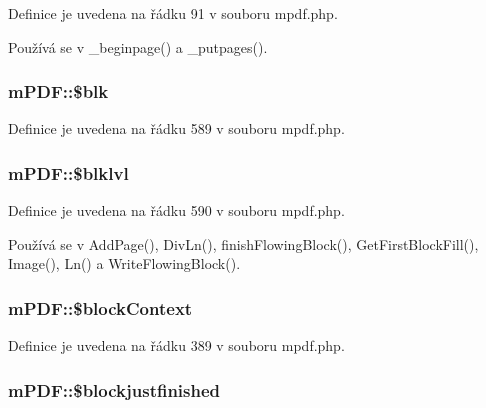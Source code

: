 Definice je uvedena na řádku 91 v souboru mpdf.\-php.



Používá se v \-\_\-beginpage() a \-\_\-putpages().

\hypertarget{classm_p_d_f_a02ce9503043f4b5527c0c0331f15a8ce}{
\subsubsection[{\$blk}]{\setlength{\rightskip}{0pt plus 5cm}m\-P\-D\-F\-::\$blk}}\label{classm_p_d_f_a02ce9503043f4b5527c0c0331f15a8ce}


Definice je uvedena na řádku 589 v souboru mpdf.\-php.

\hypertarget{classm_p_d_f_a26838ab1574182eb942f1f785b0ff3e9}{
\subsubsection[{\$blklvl}]{\setlength{\rightskip}{0pt plus 5cm}m\-P\-D\-F\-::\$blklvl}}\label{classm_p_d_f_a26838ab1574182eb942f1f785b0ff3e9}


Definice je uvedena na řádku 590 v souboru mpdf.\-php.



Používá se v Add\-Page(), Div\-Ln(), finish\-Flowing\-Block(), Get\-First\-Block\-Fill(), Image(), Ln() a Write\-Flowing\-Block().

\hypertarget{classm_p_d_f_aeb8bf2e8132366c2524ad737f728346c}{
\subsubsection[{\$block\-Context}]{\setlength{\rightskip}{0pt plus 5cm}m\-P\-D\-F\-::\$block\-Context}}\label{classm_p_d_f_aeb8bf2e8132366c2524ad737f728346c}


Definice je uvedena na řádku 389 v souboru mpdf.\-php.

\hypertarget{classm_p_d_f_a0d538b74c8bb54c8ad1194fbfa8b88a8}{
\subsubsection[{\$blockjustfinished}]{\setlength{\rightskip}{0pt plus 5cm}m\-P\-D\-F\-::\$blockjustfinished}}\label{classm_p_d_f_a0d538b74c8bb54c8ad1194fbfa8b88a8}


